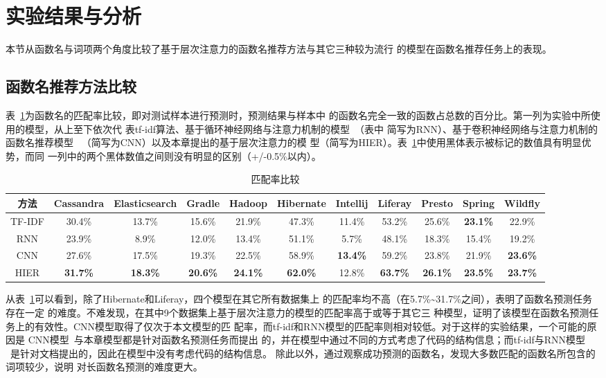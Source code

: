 \section{实验结果与分析}
本节从函数名与词项两个角度比较了基于层次注意力的函数名推荐方法与其它三种较为流行
的模型在函数名推荐任务上的表现。

\subsection{函数名推荐方法比较}
表~\ref{accuracy3}为函数名的匹配率比较，即对测试样本进行预测时，预测结果与样本中
的函数名完全一致的函数占总数的百分比。第一列为实验中所使用的模型，从上至下依次代
表tf-idf算法、基于循环神经网络与注意力机制的模型~\cite{bahdanau2015neural}（表中
简写为RNN）、基于卷积神经网络与注意力机制的函数名推荐模型
~\cite{allamanis2016convolutional}（简写为CNN）以及本章提出的基于层次注意力的模
型（简写为HIER）。表~\ref{accuracy3}中使用黑体表示被标记的数值具有明显优势，而同
一列中的两个黑体数值之间则没有明显的区别（+/-0.5\%以内）。

\begin{table}[!t]
\scriptsize
\renewcommand{\arraystretch}{1.3}
\caption{匹配率比较}
\label{accuracy3}
\centering
\begin{tabular}{c|cccccccccc}
\toprule
方法 &Cassandra &Elasticsearch &Gradle &Hadoop &Hibernate &Intellij &Liferay &Presto &Spring &Wildfly\\ 
\hline
TF-IDF&30.4\%&13.7\% &15.6\% &21.9\%&47.3\% &11.4\% &53.2\% &25.6\% &\bf{23.1\%} &22.9\%\\ 
\hline
RNN&23.9\% &8.9\% &12.0\%  &13.4\% &51.1\% &5.7\% &48.1\% &18.3\% &15.4\% &19.2\%\\ 
\hline
CNN& 27.6\% &17.5\% &19.3\% & 22.5\% &58.9\% &\bf{13.4\%} &59.2\% &23.8\% &21.9\% &\bf{23.6\%}\\ 
\hline
HIER&\bf{31.7\%} &\bf{18.3\%} &\bf{20.6\%} &\bf{24.1\%} &\bf{62.0\%} &12.8\% &\bf{63.7\%} &\bf{26.1\%} &\bf{23.5\%} &\bf{23.7\%}\\
\bottomrule
\end{tabular}
\end{table}

从表~\ref{accuracy3}可以看到，除了Hibernate和Liferay，四个模型在其它所有数据集上
的匹配率均不高（在5.7\%\textasciitilde31.7\%之间），表明了函数名预测任务存在一定
的难度。不难发现，在其中9个数据集上基于层次注意力的模型的匹配率高于或等于其它三
种模型，证明了该模型在函数名预测任务上的有效性。CNN模型取得了仅次于本文模型的匹
配率，而tf-idf和RNN模型的匹配率则相对较低。对于这样的实验结果，一个可能的原因是
CNN模型~\cite{allamanis2016convolutional}与本章模型都是针对函数名预测任务而提出
的，并在模型中通过不同的方式考虑了代码的结构信息；而tf-idf与RNN模型
~\cite{bahdanau2015neural}是针对文档提出的，因此在模型中没有考虑代码的结构信息。
除此以外，通过观察成功预测的函数名，发现大多数匹配的函数名所包含的词项较少，说明
对长函数名预测的难度更大。

